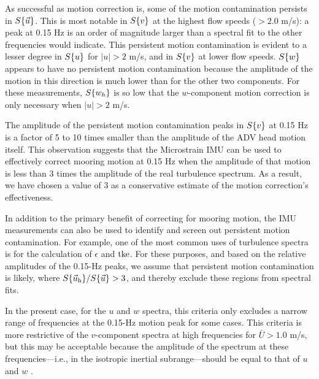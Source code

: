 As successful as motion correction is, some of the motion contamination persists in $S\{\vec{u}\}$. This is most notable in $S\{v\}$ at the highest flow speeds ($>2.0$ m/s): a peak at 0.15 Hz is an order of magnitude larger than a spectral fit to the other frequencies would indicate. This persistent motion contamination is evident to a lesser degree in $S\{u\}$ for $|u|>2$ m/s, and in $S\{v\}$ at lower flow speeds.  $S\{w\}$ appears to have no persistent motion contamination because the amplitude of the motion in this direction is much lower than for the other two components. For these measurements, $S\{w_h\}$ is so low that the $w$-component motion correction is only necessary when $|u| > 2$ m/s.

The amplitude of the persistent motion contamination peaks in $S\{v\}$ at 0.15 Hz is a factor of 5 to 10 times smaller than the amplitude of the ADV head motion itself. This observation suggests that the Microstrain IMU can be used to effectively correct mooring motion at 0.15 Hz when the amplitude of that motion is less than 3 times the amplitude of the real turbulence spectrum. As a result, we have chosen a value of 3 as a conservative estimate of the motion correction's effectiveness.
%
%


In addition to the primary benefit of correcting for mooring motion, the IMU measurements can also be used to identify and screen out persistent motion contamination. For example, one of the most common uses of turbulence spectra is for the calculation of $\epsilon$ and $\mathrm{tke}$. For these purposes, and based on the relative amplitudes of the 0.15-Hz peaks, we assume that persistent motion contamination is likely, where $S\{\vec{u}_\mathrm{h}\}/S\{\vec{u}\} > 3$, and thereby exclude these regions from spectral fits.

In the present case, for the $u$ and $w$ spectra, this criteria only excludes a narrow range of frequencies at the 0.15-Hz motion peak for some cases. This criteria is more restrictive of the $v$-component spectra at high frequencies for $\bar U > 1.0$ m/s, but this may be acceptable because the amplitude of the spectrum at these frequencies---i.e., in the isotropic inertial subrange---should be equal to that of $u$ and $w$ \cite[]{Kolmogorov1941c}.

